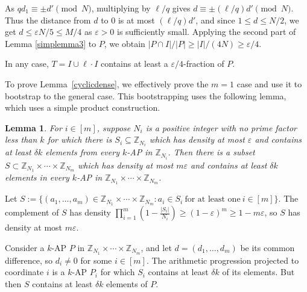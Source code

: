 \documentclass[11pt]{article}
\makeatletter
\numberwithin{equation}{section}
\renewenvironment{proof}[1][\proofname]{\par
  \vspace{-\topsep}%
  \pushQED{\qed}%
  \normalfont
  \topsep0pt \partopsep0pt %
  \trivlist
  \item[\hskip\labelsep
        \itshape
    #1\@addpunct{.}]\ignorespaces
}{%
  \popQED\endtrivlist\@endpefalse
  \addvspace{6pt plus 6pt} %
}
\newtheorem{lem}[result]{Lemma}
\theoremstyle{definition}
\theoremstyle{remark}
\makeatother
\begin{document}
\begin{proof}[Proof of Lemma \ref{intervaltocyclic}]
As $qd_1\equiv \pm d' \pmod{N}$, multiplying by $\ell/q$ gives $d \equiv \pm (\ell/q)d' \pmod{N}$. Thus the distance from $d$ to $0$ is at most $(\ell/q)d'$, and since $1 \leq d \leq N/2$, we get $d \leq \varepsilon N/5 \leq M/4$ as $\varepsilon>0$ is sufficiently small. Applying the second part of Lemma \ref{simplemma3} to $P$, we obtain $|P \cap I|/|P| \geq |I|/(4N) \geq \varepsilon/4$. 

In any case, $T=I \cup \ell \cdot I$ contains at least a $\varepsilon/4$-fraction of $P$. \end{proof}


To prove Lemma~\ref{cyclicdense}, we effectively prove the $m=1$ case and use it to bootstrap to the general case. This bootstrapping uses the following lemma, which uses a simple product construction. 

\begin{lem}\label{crtproduct}
For $i \in [m]$, suppose $N_i$ is a positive integer with no prime factor less than $k$ for which there is $S_i \subseteq \mathbb{Z}_{N_i}$ which has density at most $\varepsilon$ and contains at least $\delta k$ elements from every $k$-AP in $\mathbb{Z}_{N_i}$. Then there is a subset $S \subset \mathbb{Z}_{N_1} \times \cdots \times \mathbb{Z}_{N_m}$ which has density at most $m\varepsilon$ and contains at least $\delta k$ elements in every $k$-AP in $\mathbb{Z}_{N_1} \times \cdots \times \mathbb{Z}_{N_m}$. 
\end{lem}
\begin{proof}
Let $S:=\{(a_1,\ldots,a_m) \in \mathbb{Z}_{N_1} \times \cdots \times \mathbb{Z}_{N_m}: a_i \in S_i~\textrm{for at least one}~i \in [m]\}$. The complement of $S$ has density $\prod_{i=1}^m \left(1-\frac{|S_i|}{N_i}\right) \geq (1-\varepsilon)^m \geq 1-m\varepsilon$, so $S$ has density at most $m\varepsilon$. 

Consider a $k$-AP $P$ in $\mathbb{Z}_{N_1} \times \cdots \times \mathbb{Z}_{N_m}$, and let $d=(d_1,\ldots,d_m)$ be its common difference, so $d_i \not = 0$ for some $i \in [m]$. The arithmetic progression projected to coordinate $i$ is a $k$-AP $P_i$ for which $S_i$ contains at least $\delta k$ of its elements. But then $S$ contains at least $\delta k$ elements of $P$. 
\end{proof}
\end{document}
